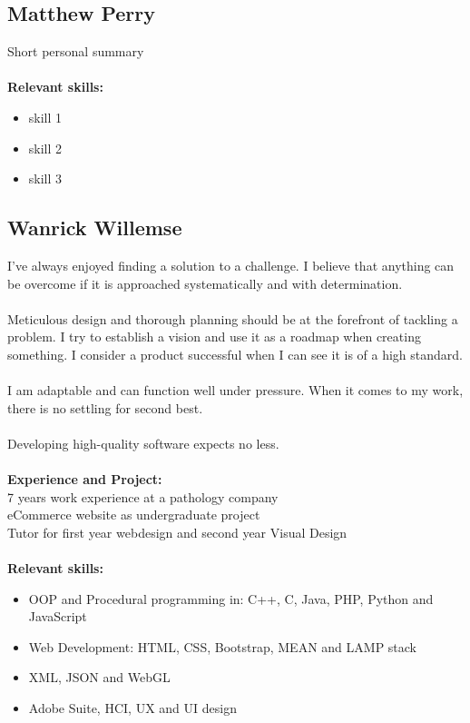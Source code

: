 \documentclass[12pt,a4paper]{article}
\begin{document}
		
		\subsection{Matthew Perry}
		Short personal summary\\\\
		\textbf{\small Relevant skills:}
		\begin{itemize}
			\item skill 1
			\item skill 2
			\item skill 3
		\end{itemize}
		
		\subsection{Wanrick Willemse}
		I’ve always enjoyed finding a solution to a challenge. I believe that anything can be overcome if it is approached systematically and with determination.\\\\
Meticulous design and thorough planning should be at the forefront of tackling a problem. I try to establish a vision and use it as a roadmap when creating something. I consider a product successful when I can see it is of a high standard.\\\\
I am adaptable and can function well under pressure. When it comes to my work, there is no settling for second best.\\\\
Developing high-quality software expects no less.\\\\
		\textbf{\small Experience and Project:}\\
		7 years work experience at a pathology company\\
		eCommerce website as undergraduate project\\
		Tutor for first year webdesign and second year Visual Design\\\\
		\textbf{\small Relevant skills:}
		\begin{itemize}
			\item OOP and Procedural programming in: C++, C, Java, PHP, Python and JavaScript
			\item Web Development: HTML, CSS, Bootstrap, MEAN and LAMP stack
			\item XML, JSON and WebGL
			\item Adobe Suite, HCI, UX and UI design
		\end{itemize}
		
\end{document}

